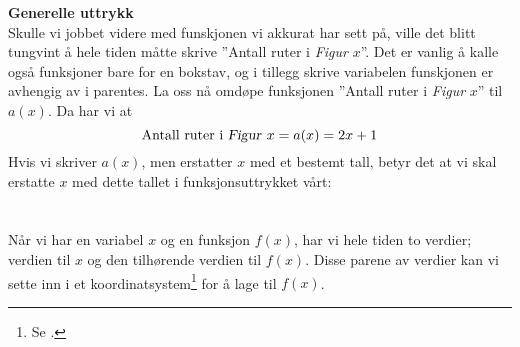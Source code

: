 \newpage
\textbf{Generelle uttrykk} \\
Skulle vi jobbet videre med funskjonen vi akkurat har sett på, ville det blitt tungvint å hele tiden måtte skrive ''Antall ruter i \textsl{Figur }$ x $''. Det er vanlig å kalle også funksjoner bare for en bokstav, og i tillegg skrive variabelen funskjonen er avhengig av i parentes. La oss nå omdøpe funksjonen ''Antall ruter i \textsl{Figur} $ x $'' til $ a(x) $. Da har vi at
\[ \text{Antall ruter i \textsl{Figur }}x=a(x)=2x+1 \]
Hvis vi skriver $ a(x) $, men erstatter $ x $ med et bestemt tall, betyr det at vi skal erstatte $ x $ med dette tallet i funksjonsuttrykket vårt:
\newpage
{}
\section{\lingraf}
Når vi har en variabel $ x $ og en funksjon $ f(x) $, har vi hele tiden to verdier; verdien til $ x $ og den tilhørende verdien til $ f(x) $. Disse parene av verdier kan vi sette inn i et koordinatsystem\footnote{Se .} for å lage  til $ f(x) $. \vsk

